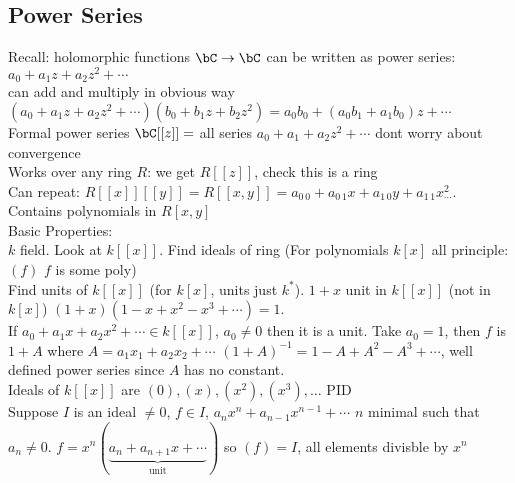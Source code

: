 
\subsection{Power Series} 

Recall: holomorphic functions $\bC \to \bC$ can be written as power series: $a_0 + a_1z + a_2z^2 + \cdots$ \\
can add and multiply in obvious way $(a_0 + a_1z + a_2z^2 + \cdots)(b_0 + b_1z + b_2z^2) = a_0b_0 + (a_0b_1 + a_1b_0)z + \cdots$ \\
Formal power series $\bC [[z]] = $ all series $a_0 + a_1 + a_2z^2 + \cdots$ dont worry about convergence \\ 
Works over any ring $R$: we get $R[[z]]$, check this is a ring\\
Can repeat: $R[[x]][[y]] = R[[x,y]] = a_{0 \, 0} + a_{0 \, 1}x + a_{1 \, 0}y + a_{1 \, 1}x^2 _ \cdots$. Contains polynomials in $R[x,y]$ \\

\noindent
Basic Properties:  \\ 
$k$ field. Look at $k[[x]]$. Find ideals of ring (For polynomials $k[x]$ all principle: $(f)$ $f$ is some poly) \\ 
Find units of $k[[x]]$ (for $k[x]$, units just $k^*$). $1 + x$ unit in $k[[x]]$ (not in $k[x]$) $(1 + x)(1-x+x^2 -x^3 + \cdots) = 1$. \\
If $a_0 + a_1x + a_2x^2 + \cdots \in k[[x]]$, $a_0 \neq 0$ then it is a unit. Take $a_0 = 1$, then $f$ is $1 + A$ where $A = a_1x_1 + a_2x_2 + \cdots$ $(1 + A)^{-1} = 1 - A + A^2 - A^3 + \cdots$, well defined power series since $A$ has no constant. \\

\noindent
Ideals of $k[[x]]$ are $(0), (x), (x^2), (x^3), \ldots$ PID \\
Suppose $I$ is an ideal $\neq 0$, $f \in I$, $a_nx^n + a_{n-1}x^{n-1} + \cdots$ $n$ minimal such that $a_n \neq 0$. $f = x^n(\underbrace{a_n + a_{n+1}x + \cdots}_{\text{unit}})$ so $(f) = I$, all elements divisble by $x^n$ \\

